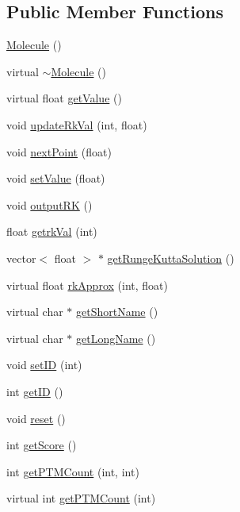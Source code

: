 \subsection*{Public Member Functions}
\begin{DoxyCompactItemize}
\item 
\hyperlink{classMolecule_a7e7d290ae641518ad4c4d5303b519d0f}{Molecule} ()
\item 
virtual \hyperlink{classMolecule_a1ff980b574a62526abff3d631c83bf94}{$\sim$Molecule} ()
\item 
virtual float \hyperlink{classMolecule_a554ea822918374775d5f52b5d49d8195}{getValue} ()
\item 
void \hyperlink{classMolecule_ab1dd1cb050ddb53a5ce4d9635e3ae03b}{updateRkVal} (int, float)
\item 
void \hyperlink{classMolecule_af67c8a4dcbde3f500509ee1bd94ff4ef}{nextPoint} (float)
\item 
void \hyperlink{classMolecule_a227fedba365853cee63c4e18669a56fa}{setValue} (float)
\item 
void \hyperlink{classMolecule_ac6c78f4a49e270815d7e7dba311b7e14}{outputRK} ()
\item 
float \hyperlink{classMolecule_a66d5e242462b12c0a742fedec0a6bf78}{getrkVal} (int)
\item 
vector$<$ float $>$ $\ast$ \hyperlink{classMolecule_a4405c3a17adfed340826d8b31e4da589}{getRungeKuttaSolution} ()
\item 
virtual float \hyperlink{classMolecule_adabb58a65655a7f55dae0d82b65d04ba}{rkApprox} (int, float)
\item 
virtual char $\ast$ \hyperlink{classMolecule_a6d8720e89d81c1297beced997ad62718}{getShortName} ()
\item 
virtual char $\ast$ \hyperlink{classMolecule_a6d3c3fd4827a62dacfd9d7a7d3a7f6ea}{getLongName} ()
\item 
void \hyperlink{classMolecule_a4f1f48fc2b13b96d7f8015394895e240}{setID} (int)
\item 
int \hyperlink{classMolecule_a9a596dbbdced6d8cec10ad158d4a9f2a}{getID} ()
\item 
void \hyperlink{classMolecule_ab073ddc977c06fe8f70b2c5108eead8c}{reset} ()
\item 
int \hyperlink{classMolecule_a125243e73faff1e5e482e65ba923ca3a}{getScore} ()
\item 
int \hyperlink{classMolecule_ae946ae8bea91c5893ad9bf0fb66b6e0d}{getPTMCount} (int, int)
\item 
virtual int \hyperlink{classMolecule_a7a8b15817d1f1baafe07b50c29cbbc9d}{getPTMCount} (int)
\end{DoxyCompactItemize}
